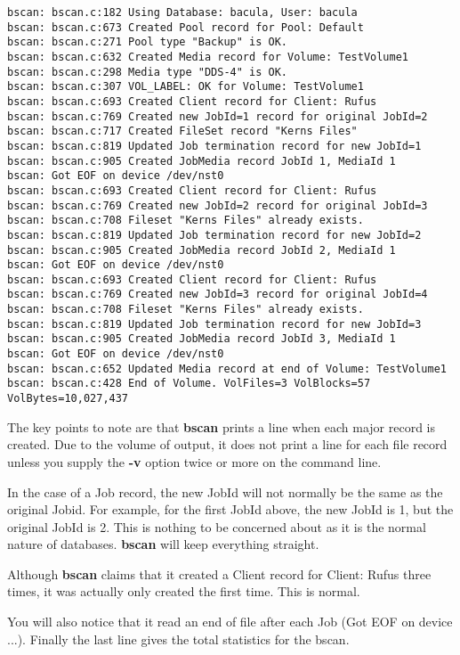 \footnotesize
\begin{verbatim}
bscan: bscan.c:182 Using Database: bacula, User: bacula
bscan: bscan.c:673 Created Pool record for Pool: Default
bscan: bscan.c:271 Pool type "Backup" is OK.
bscan: bscan.c:632 Created Media record for Volume: TestVolume1
bscan: bscan.c:298 Media type "DDS-4" is OK.
bscan: bscan.c:307 VOL_LABEL: OK for Volume: TestVolume1
bscan: bscan.c:693 Created Client record for Client: Rufus
bscan: bscan.c:769 Created new JobId=1 record for original JobId=2
bscan: bscan.c:717 Created FileSet record "Kerns Files"
bscan: bscan.c:819 Updated Job termination record for new JobId=1
bscan: bscan.c:905 Created JobMedia record JobId 1, MediaId 1
bscan: Got EOF on device /dev/nst0
bscan: bscan.c:693 Created Client record for Client: Rufus
bscan: bscan.c:769 Created new JobId=2 record for original JobId=3
bscan: bscan.c:708 Fileset "Kerns Files" already exists.
bscan: bscan.c:819 Updated Job termination record for new JobId=2
bscan: bscan.c:905 Created JobMedia record JobId 2, MediaId 1
bscan: Got EOF on device /dev/nst0
bscan: bscan.c:693 Created Client record for Client: Rufus
bscan: bscan.c:769 Created new JobId=3 record for original JobId=4
bscan: bscan.c:708 Fileset "Kerns Files" already exists.
bscan: bscan.c:819 Updated Job termination record for new JobId=3
bscan: bscan.c:905 Created JobMedia record JobId 3, MediaId 1
bscan: Got EOF on device /dev/nst0
bscan: bscan.c:652 Updated Media record at end of Volume: TestVolume1
bscan: bscan.c:428 End of Volume. VolFiles=3 VolBlocks=57 VolBytes=10,027,437
\end{verbatim}
\normalsize

The key points to note are that {\bf bscan} prints a line when each major
record is created. Due to the volume of output, it does not print a line for
each file record unless you supply the {\bf -v} option twice or more on the
command line. 

In the case of a Job record, the new JobId will not normally be the same as
the original Jobid. For example, for the first JobId above, the new JobId is
1, but the original JobId is 2. This is nothing to be concerned about as it is
the normal nature of databases. {\bf bscan} will keep everything straight. 

Although {\bf bscan} claims that it created a Client record for Client: Rufus
three times, it was actually only created the first time. This is normal. 

You will also notice that it read an end of file after each Job (Got EOF on
device ...). Finally the last line gives the total statistics for the bscan. 

